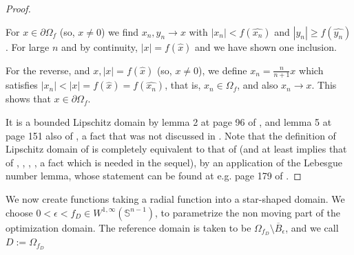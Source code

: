 \documentclass[english,a4paper,10pt,oneside]{scrbook}	%
\theoremstyle{break}
\newenvironment{mproof}[1][\proofname]{%
  \begin{proof}[#1]$ $\par\nobreak\ignorespaces
}{%
  \end{proof}
}
\renewcommand*{\proofname}{Proof}
\theoremstyle{remark}
\newcommand{\mS}{\mathbb{S}^{n-1}}
\newcommand{\xh}{\hat{x}}
\newcommand{\eps}{\epsilon}
\begin{document}
\begin{mproof}

For $x \in \partial \Omega_f$ (so, $x\neq 0$) we find $x_n, y_n \rightarrow x$ with $|x_n|<f(\widehat{x_n})$ and $|y_n|\geq f(\widehat{y_n})$. For large $n$ and by continuity, $|x| = f(\xh)$ and we have shown one inclusion.

For the reverse, and $x, |x|=f(\xh)$ (so, $x\neq 0$), we define $x_n = \frac{n}{n+1} x$ which satisfies $|x_n|<|x|=f(\xh)=f(\widehat{x_n})$, that is, $x_n \in \Omega_f$, and also $x_n\rightarrow x$. This shows that $x \in \partial \Omega_f$.

It is a bounded Lipschitz domain by lemma 2 at page 96 of \cite{burenkov}, and lemma 5 at page 151 also of \cite{burenkov}, a fact that was not discussed in \cite{deckelnick}. Note that the definition of Lipschitz domain of \cite{burenkov} is completely equivalent to that of \cite{bello} (and at least implies that of \cite{mclean}, \cite{grisvard}, \cite{leoni}, \cite{adams}, a fact which is needed in the sequel), by an application of the Lebesgue number lemma, whose statement can be found at e.g. page 179 of \cite{munkres}.

\end{mproof}

We now create functions taking a radial function into a star-shaped domain. We choose $0<\eps <f_D \in W^{1,\infty}(\mS)$, to parametrize the non moving part of the optimization domain. The reference domain is taken to be $\Omega_{f_D}\setminus \overline{B}_\eps$, and we call $D:=\Omega_{f_D}$
\end{document}
